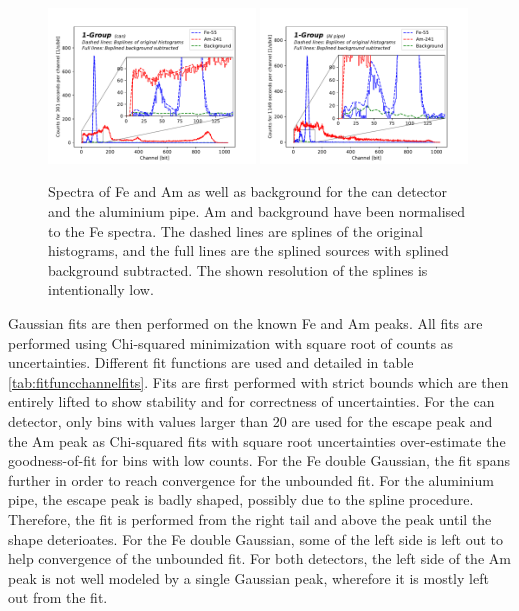 \begin{figure}[htb!]
  \includegraphics[width=0.49\textwidth,page=1]{graphics/bkgsubtraction.pdf}
  \includegraphics[width=0.49\textwidth,page=1]{graphics/alubkgsubtraction.pdf}
  \caption{Spectra of Fe and Am as well as background for the can detector and the aluminium pipe. Am and background have been normalised to the Fe spectra. The dashed lines are splines of the original histograms, and the full lines are the splined sources with splined background subtracted. The shown resolution of the splines is intentionally low.}
  \label{fig:spectra}
\end{figure}

Gaussian fits are then performed on the known Fe and Am peaks. All fits are performed using Chi-squared minimization with square root of counts as uncertainties. Different fit functions are used and detailed in table \ref{tab:fitfuncchannelfits}. Fits are first performed with strict bounds which are then entirely lifted to show stability and for correctness of uncertainties. For the can detector, only bins with values larger than 20 are used for the escape peak and the Am peak as Chi-squared fits with square root uncertainties over-estimate the goodness-of-fit for bins with low counts. For the Fe double Gaussian, the fit spans further in order to reach convergence for the unbounded fit. For the aluminium pipe, the escape peak is badly shaped, possibly due to the spline procedure. Therefore, the fit is performed from the right tail and above the peak until the shape deterioates. For the Fe double Gaussian, some of the left side is left out to help convergence of the unbounded fit. For both detectors, the left side of the Am peak is not well modeled by a single Gaussian peak, wherefore it is mostly left out from the fit.

